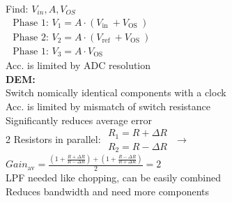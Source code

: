 \documentclass[5pt]{article}
\begin{document}
\begin{multicols*}{4}
Find: $ V_{in} , A , V_{OS} $\\
$ \begin{array}{l}
\text { Phase 1: } V_{1}=A \cdot\left(V_{\text {in }}+V_{\text {OS }}\right) \\
\text { Phase 2: } V_{2}=A \cdot\left(V_{\text {ref }}+V_{\text {OS }}\right) \\
\text { Phase 1: } V_{3}=A \cdot V_{\text {OS }}
\end{array} $\\
Acc. is limited by ADC resolution\\
\textbf{DEM:}\\
Switch nomically identical components with a clock\\
Acc. is limited by mismatch of switch resistance\\
Significantly reduces average error\\
2 Resistors in parallel:
$ \begin{array}{l}
R_{1}=R+\Delta R \\
R_{2}=R-\Delta R
\end{array} $ $ \rightarrow $\\
$ Gain_{\mathrm{av}}=\frac{\left(1+\frac{R+\Delta R}{R-\Delta R}\right)+\left(1+\frac{R-\Delta R}{R+\Delta R}\right)}{2}=2 $\\
LPF needed like chopping, can be easily combined\\
Reduces bandwidth and need more components

\end{multicols*}
\end{document}
